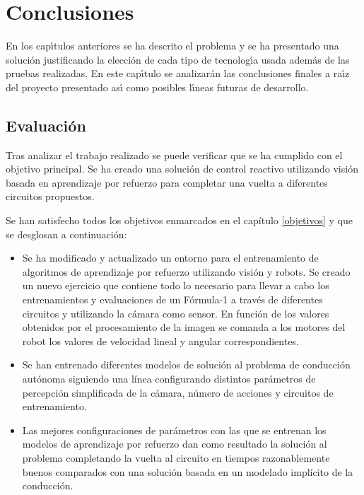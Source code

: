 \chapter{Conclusiones}

En los capı́tulos anteriores se ha descrito el problema y se ha presentado una solución justificando la elección de cada tipo de tecnologı́a usada además de las pruebas realizadas. En este capı́tulo se analizarán las conclusiones finales a raı́z del proyecto presentado ası́ como posibles lı́neas futuras de desarrollo.

\section{Evaluación}

Tras analizar el trabajo realizado se puede verificar que se ha cumplido con el objetivo principal. Se ha creado una solución de control reactivo utilizando visión basada en aprendizaje por refuerzo para completar una vuelta a diferentes circuitos propuestos.


Se han satisfecho todos los objetivos enmarcados en el capítulo \ref{objetivos} y que se desglosan a continuación:\\

\begin{itemize}
    \item Se ha modificado y actualizado un entorno para el entrenamiento de algoritmos de aprendizaje por refuerzo utilizando visión y robots. Se creado un nuevo ejercicio que contiene todo lo necesario para llevar a cabo los entrenamientos y evaluaciones de un Fórmula-1 a través de diferentes circuitos y utilizando la cámara como sensor. En función de los valores obtenidos por el procesamiento de la imagen se comanda a los motores del robot los valores de velocidad lineal y angular correspondientes.\\
    
    \item Se han entrenado diferentes modelos de solución al problema de conducción autónoma siguiendo una línea configurando distintos parámetros de percepción simplificada de la cámara, número de acciones y circuitos de entrenamiento.\\
    
    \item Las mejores configuraciones de parámetros con las que se entrenan los modelos de aprendizaje por refuerzo dan como resultado la solución al problema completando la vuelta al circuito en tiempos razonablemente buenos comparados con una solución basada en un modelado implícito de la conducción.\\
\end{itemize}


